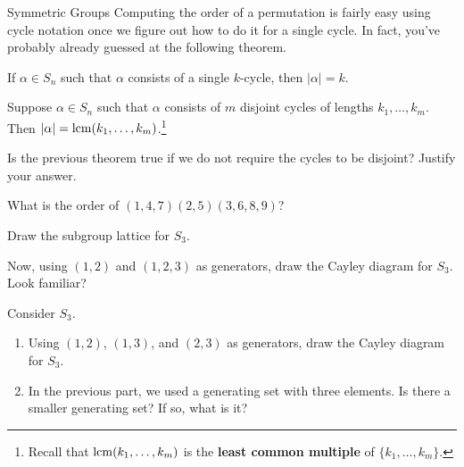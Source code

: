 \begin{section}{Symmetric Groups}
Computing the order of a permutation is fairly easy using cycle notation once we figure out how to do it for a single cycle.  In fact, you've probably already guessed at the following theorem.

\begin{theorem}
If $\alpha\in S_n$ such that $\alpha$ consists of a single $k$-cycle, then $|\alpha|=k$.
\end{theorem}

\begin{theorem}
Suppose $\alpha\in S_n$ such that $\alpha$ consists of $m$ disjoint cycles of lengths $k_1,\ldots, k_m$.  Then $|\alpha|=\operatorname{lcm}(k_1,\ldots, k_m)$.\footnote{Recall that $\operatorname{lcm}(k_1,\ldots, k_m)$ is the \textbf{least common multiple} of $\{k_1,\ldots, k_m\}$.} 
\end{theorem}

\begin{problem}
Is the previous theorem true if we do not require the cycles to be disjoint?  Justify your answer.
\end{problem}

\begin{problem}
What is the order of $(1,4,7)(2,5)(3,6,8,9)$?
\end{problem}

\begin{problem}
Draw the subgroup lattice for $S_3$.
\end{problem}

\begin{problem}
Now, using $(1,2)$ and $(1,2,3)$ as generators, draw the Cayley diagram for $S_3$.  Look familiar?
\end{problem}

\begin{problem}
Consider $S_3$.
\begin{enumerate}[label=\textrm{(\alph*)}]
\item Using $(1,2)$, $(1,3)$, and $(2,3)$ as generators, draw the Cayley diagram for $S_3$.
\item In the previous part, we used a generating set with three elements.  Is there a smaller generating set?  If so, what is it?
\end{enumerate}
\end{problem}


\end{section}
